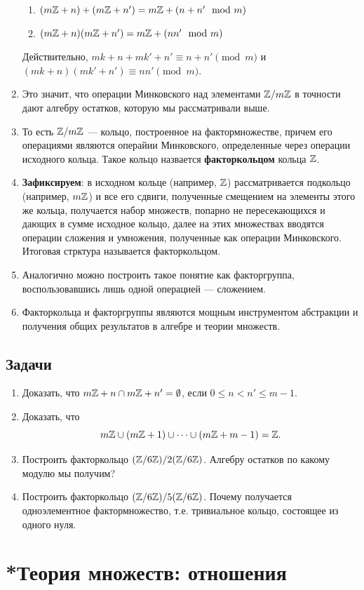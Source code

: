 \begin{enumerate}
\begin{enumerate}[Z1]
\item $(m\mathbb Z+n)+(m\mathbb Z+n') = m\mathbb Z+(n+n'\mod m)$
\item $(m\mathbb Z+n)(m\mathbb Z+n') = m\mathbb Z+(nn'\mod m)$
\end{enumerate}
Действительно, $mk+n+mk'+n'\equiv n+n'\pmod m$ и $(mk+n)(mk'+n')\equiv nn'\pmod m$.
\item Это значит, что операции Минковского над элементами $\mathbb Z/m\mathbb Z$ в точности дают алгебру остатков, которую мы рассматривали выше.
\item То есть $\mathbb Z/m\mathbb Z$ --- кольцо, построенное на фактормножестве, причем его операциями являются операйии Минковского, определенные через операции исходного кольца. Такое кольцо назвается \textbf{факторкольцом} кольца $\mathbb Z$.
\item \textbf{Зафиксируем}: в исходном кольце (например, $\mathbb Z$) рассматривается подкольцо (например, $m\mathbb Z$) и все его сдвиги, полученные смещением на элементы этого же кольца, получается набор множеств, попарно не пересекающихся и дающих в сумме исходное кольцо, далее на этих множествах вводятся операции сложения и умножения, полученные как операции Минковского. Итоговая стрктура называется факторкольцом.
\item Аналогично можно построить такое понятие как факторгруппа, воспользовавшись лишь одной операцией --- сложением.
\item Факторкольца и факторгруппы являются мощным инструментом абстракции и получения общих результатов в алгебре и теории множеств.
\end{enumerate}


\subsection*{Задачи}
\begin{enumerate}
\item Доказать, что $m\mathbb Z+n\cap m\mathbb Z+n'=\emptyset$, если $0\le n<n'\le m-1$.
\item Доказать, что
$$
m\mathbb Z\cup (m\mathbb Z+1)\cup\dots\cup (m\mathbb Z+m-1) = \mathbb Z.
$$
\item Построить факторкольцо $(\mathbb Z/6\mathbb Z)/2(\mathbb Z/6\mathbb Z)$. Алгебру остатков по какому модулю мы получим?
\item Построить факторкольцо $(\mathbb Z/6\mathbb Z)/5(\mathbb Z/6\mathbb Z)$. Почему получается одноэлементное фактормножество, т.е. тривиальное кольцо, состоящее из одного нуля.
\end{enumerate}


\section{*Теория множеств: отношения}\label{Rels}

